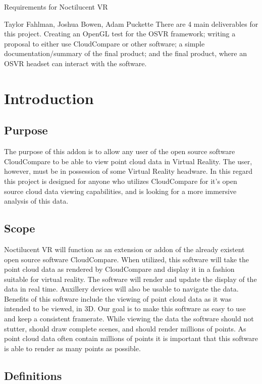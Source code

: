 \documentclass[titlepage]{article}
\begin{document}
\begin{titlepage}
\centering
{\Huge Requirements for Noctilucent VR\par}
{\Large Taylor Fahlman, Joshua Bowen, Adam Puckette}
\abstract
There are 4 main deliverables for this project. Creating an OpenGL test for the OSVR framework;
writing a proposal to either use CloudCompare or other software; a simple documentation/summary of
the final product; and the final product, where an OSVR headset can interact with the software.
\end{titlepage}

\section{Introduction}
\subsection{Purpose}

The purpose of this addon is to allow any user of the open source software CloudCompare to be able to view point cloud data in Virtual Reality.
The user, however, must be in possession of some Virtual Reality headware. 
In this regard this project is designed for anyone who utilizes CloudCompare for it's open source cloud data viewing capabilities,
and is looking for a more immersive analysis of this data.

\subsection{Scope}

Noctilucent VR will function as an extension or addon of the already existent open source software CloudCompare.
When utilized, this software will take the point cloud data as rendered by CloudCompare and display it in a fashion suitable for virtual reality.
The software will render and update the display of the data in real time.
Auxillery devices will also be usable to navigate the data.
Benefits of this software include the viewing of point cloud data as it was intended to be viewed, in 3D.
Our goal is to make this software as easy to use and keep a consistent framerate.
While viewing the data the software should not stutter,
should draw complete scenes,
and should render millions of points.
As point cloud data often contain millions of points it is important that this software is able to render as many points as possible.

\subsection{Definitions}
\end{document}

